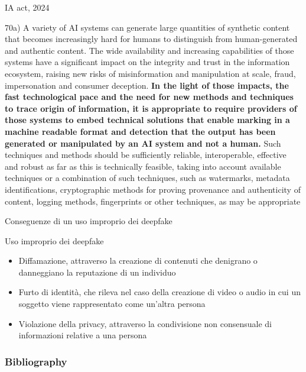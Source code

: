 \documentclass[11pt]{beamer}
\begin{document}
\begin{frame}{IA act, 2024}
\begin{center}
\small
70a) A variety of AI systems can generate large quantities of synthetic content that becomes increasingly hard for humans to distinguish from human-generated and authentic content. The wide availability and increasing capabilities of those systems have a significant impact on the integrity and trust in the information ecosystem, raising new risks of misinformation and manipulation at scale, fraud, impersonation and consumer deception. \textbf{In the light of those impacts, the fast technological pace and the need for new methods and techniques to trace origin of information, it is appropriate to require providers of those systems to embed technical solutions that enable marking in a machine readable format and detection that the output has been generated or manipulated by an AI system and not a human.} Such techniques and methods should be sufficiently reliable, interoperable, effective and robust as far as this is technically feasible, taking into account available techniques or a combination of such techniques, such as watermarks, metadata identifications, cryptographic methods for proving provenance and authenticity of content, logging methods, fingerprints or other techniques, as may be appropriate
\end{center}
\end{frame}

\begin{frame}{Conseguenze di un uso improprio dei deepfake \cite{deepfake_jus}}
\begin{alertblock}{Uso improprio dei deepfake}
\begin{itemize}
\item Diffamazione, attraverso la creazione di contenuti che denigrano o danneggiano la reputazione di un individuo
\item Furto di identità, che rileva nel caso della creazione di video o audio in cui un soggetto viene rappresentato come un’altra persona
\item Violazione della privacy, attraverso la condivisione non consensuale di informazioni relative a una persona
\end{itemize}
\end{alertblock}
\end{frame}










\begin{frame}[t,allowframebreaks]
\frametitle{Bibliography}
\printbibliography
\end{frame}
\end{document}
